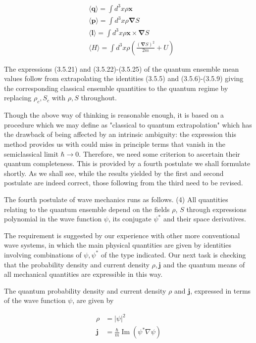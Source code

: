 \documentclass{article}
\begin{document}
\begin{align*}
& \langle\boldsymbol{q}\rangle=\int d^{3} x \rho \boldsymbol{x}  \tag{3.5.22}\\
& \langle\boldsymbol{p}\rangle=\int d^{3} x \rho \boldsymbol{\nabla} S  \tag{3.5.23}\\
& \langle\boldsymbol{l}\rangle=\int d^{3} x \rho \boldsymbol{x} \times \boldsymbol{\nabla} S  \tag{3.5.24}\\
& \langle H\rangle=\int d^{3} x \rho\left(\frac{(\boldsymbol{\nabla} S)^{2}}{2 m}+U\right) \tag{3.5.25}
\end{align*}
 

The expressions (3.5.21) and (3.5.22)-(3.5.25) of the quantum ensemble mean values follow from extrapolating the identities (3.5.5) and (3.5.6)-(3.5.9) giving the corresponding classical ensemble quantities to the quantum regime by replacing $\rho_{c}, S_{c}$ with $\rho, S$ throughout.

Though the above way of thinking is reasonable enough, it is based on a procedure which we may define as "classical to quantum extrapolation" which has the drawback of being affected by an intrinsic ambiguity: the expression this method provides us with could miss in principle terms that vanish in the semiclassical limit $\hbar \rightarrow 0$. Therefore, we need some criterion to ascertain their quantum completeness. This is provided by a fourth postulate we shall formulate
shortly. As we shall see, while the results yielded by the first and second postulate are indeed correct, those following from the third need to be revised.

The fourth postulate of wave mechanics runs as follows.
(4) All quantities relating to the quantum ensemble depend on the fields $\rho$, $S$ through expressions polynomial in the wave function $\psi$, its conjugate $\psi^{*}$ and their space derivatives.

The requirement is suggested by our experience with other more conventional wave systems, in which the main physical quantities are given by identities involving combinations of $\psi, \psi^{*}$ of the type indicated. Our next task is checking that the probability density and current density $\rho, \boldsymbol{j}$ and the quantum means of all mechanical quantities are expressible in this way.

The quantum probability density and current density $\rho$ and $\boldsymbol{j}$, expressed in terms of the wave function $\psi$, are given by
 
\begin{align*}
\rho & =|\psi|^{2}  \tag{3.5.26}\\
\boldsymbol{j} & =\frac{\hbar}{m} \operatorname{Im}\left(\psi^{*} \nabla \psi\right) \tag{3.5.27}
\end{align*}
 
\end{document}
